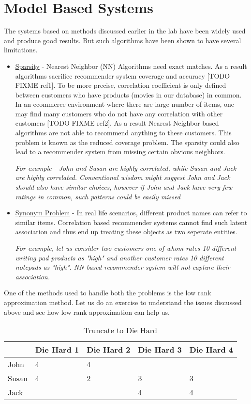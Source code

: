\section{Model Based Systems}
  The systems based on methods discussed earlier in the lab have been widely used and produce good results. But such algorithms have been shown to have several limitations. 
  \begin{itemize}
    \item \underline{Sparsity} - Nearest Neighbor (NN) Algorithms need exact matches. As a result algorithms sacrifice recommender system coverage and accuracy [TODO FIXME ref1]. To be more precise, correlation coefficient is only defined between customers who have products (movies in our database) in common. In an ecommerce environment where there are large number of items, one may find many customers who do not have any correlation with other customers [TODO FIXME ref2]. As a result Nearest Neighbor based algorithms are not able to recommend anything to these customers. This problem is known as the reduced coverage problem. The sparsity could also lead to a recommender system from missing certain obvious neighbors. 

\textit{For example - John and Susan are highly correlated, while Susan and Jack are highly correlated. Conventional wisdom might suggest John and Jack should also have similar choices, however if John and Jack have very few ratings in common, such patterns could be easily missed}
    \item \underline{Synonym Problem} - In real life scenarios, different product names can refer to similar items. Correlation based recommender systems cannot find such latent association and thus end up treating these objects as two seperate entities. 

\textit{For example, let us consider two customers one of whom rates 10 different writing pad products as "high" and another customer rates 10 different notepads as "high". NN based recommender system will not capture their association.}
  \end{itemize}
  One of the methods used to handle both the problems is the low rank approximation method. Let us do an exercise to understand the issues discussed above and see how low rank approximation can help us. \\
  \begin{table}[]
  \centering
  \label{my-label}
  \begin{tabular}{|l|l|l|l|l|}
  \hline
      & Die Hard 1 & Die Hard 2 & Die Hard 3 & Die Hard 4 \\ \hline
John  & 4          & 4          &            &            \\ \hline
Susan & 4          & 2          & 3          & 3          \\ \hline
Jack  &            &            & 4          & 4          \\ \hline
  \end{tabular}
  \caption{Truncate to Die Hard}
  \label{Model-1}
  \end{table}
